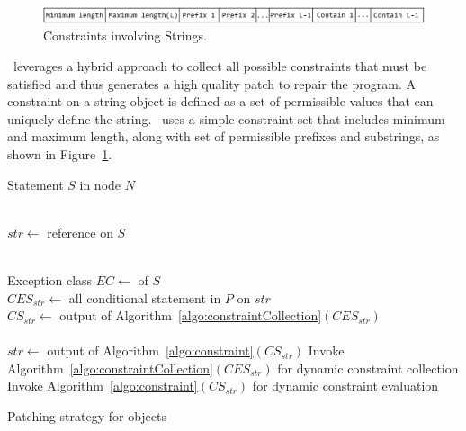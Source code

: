 %
\begin{figure}[t]
\centering
\includegraphics[width=\linewidth]{images/constraint.eps}
\caption{Constraints involving Strings.}
\label{fig:constraint}
\end{figure}
% 

 \tool\ leverages a hybrid
approach to collect all possible constraints that must be satisfied and thus generates a high quality
patch to repair the program. A constraint on a string object is defined as a set
of permissible values that can uniquely define the string. \tool\ uses a simple
constraint set that includes minimum and maximum length, along with set of
permissible prefixes and substrings, as shown in Figure~\ref{fig:constraint}.

\begin{algorithm}[t]
\scriptsize
\DontPrintSemicolon
{}
\Begin
{
  {
  Statement $S$ in node $N$
   {\\
  	$str \longleftarrow$  reference on $S$
  	
  	 {\\
  	  \mytab Exception class $EC \longleftarrow$  of
$S$\\
          \mytab $CES_{str} \longleftarrow$ all conditional statement in $P$ on
$str$\\
  	  \mytab $CS_{str} \longleftarrow$ output of
Algorithm~\ref{algo:constraintCollection}$(CES_{str})$\\

  		\mytab {} {\\
  			\mytab \mytab $str \longleftarrow$ output of
Algorithm~\ref{algo:constraint}$(CS_{str})$
  		} \mytab {}
  		\mytab Invoke
Algorithm~\ref{algo:constraintCollection}$(CES_{str})$ for dynamic constraint
collection\\
  		\mytab Invoke Algorithm~\ref{algo:constraint}$(CS_{str})$ for
dynamic constraint evaluation
  	}
  }
 }
}
\caption{Patching strategy for  objects}
\label{algo:patchingStrategy}
\end{algorithm}

